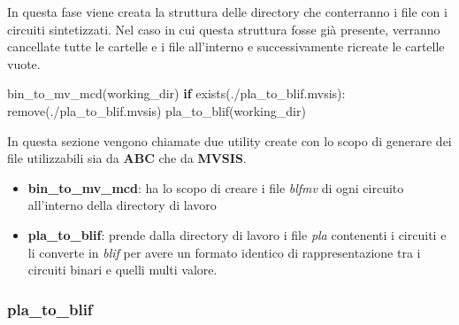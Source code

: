 \documentclass[
]{book}
\newenvironment{Shaded}{\begin{snugshade}}{\end{snugshade}}
\newcommand{\ControlFlowTok}[1]{\textcolor[rgb]{0.13,0.29,0.53}{\textbf{#1}}}
\newcommand{\NormalTok}[1]{#1}
\newcommand{\StringTok}[1]{\textcolor[rgb]{0.31,0.60,0.02}{#1}}
\providecommand{\tightlist}{%
  \setlength{\itemsep}{0pt}\setlength{\parskip}{0pt}}
\begin{document}
In questa fase viene creata la struttura delle directory che conterranno i file con i circuiti sintetizzati. Nel caso in cui questa struttura fosse già presente, verranno cancellate tutte le cartelle e i file all'interno e successivamente ricreate le cartelle vuote.

\begin{Shaded}
\begin{Highlighting}[]
\NormalTok{bin\_to\_mv\_mcd(working\_dir)}
\ControlFlowTok{if}\NormalTok{ exists(}\StringTok{\textquotesingle{}./pla\_to\_blif.mvsis\textquotesingle{}}\NormalTok{):}
\NormalTok{  remove(}\StringTok{\textquotesingle{}./pla\_to\_blif.mvsis\textquotesingle{}}\NormalTok{)}
\NormalTok{pla\_to\_blif(working\_dir)}
\end{Highlighting}
\end{Shaded}

\newpage

In questa sezione vengono chiamate due utility create con lo scopo di generare dei file utilizzabili sia da \textbf{ABC} che da \textbf{MVSIS}.

\begin{itemize}
\tightlist
\item
  \textbf{bin\_to\_mv\_mcd}: ha lo scopo di creare i file \emph{blfmv} di ogni circuito all'interno della directory di lavoro
\item
  \textbf{pla\_to\_blif}: prende dalla directory di lavoro i file \emph{pla} contenenti i circuiti e li converte in \emph{blif} per avere un formato identico di rappresentazione tra i circuiti binari e quelli multi valore.
\end{itemize}

\newpage

\hypertarget{pla_to_blif}{%
\subsubsection{pla\_to\_blif}\label{pla_to_blif}}
\end{document}
